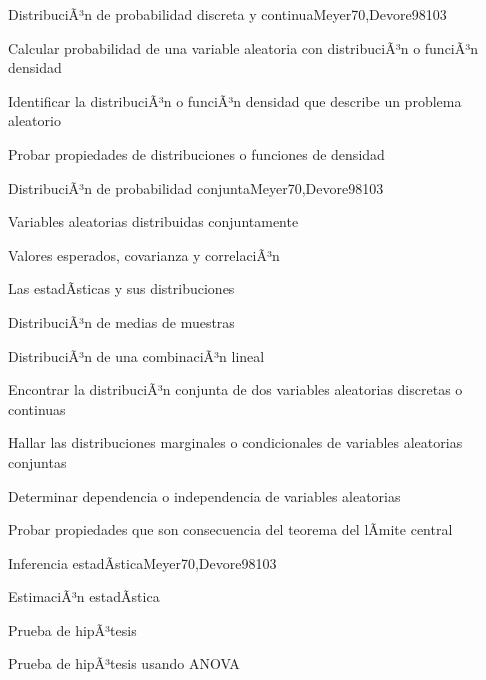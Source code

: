 \begin{syllabus}
\begin{unit}{DistribuciÃ³n de probabilidad discreta y continua}{Meyer70,Devore98}{10}{3}
   \begin{learningoutcomes}
      \item Calcular probabilidad de una variable aleatoria con distribuciÃ³n o funciÃ³n densidad
      \item Identificar la distribuciÃ³n o funciÃ³n densidad que describe un problema aleatorio
      \item Probar propiedades de distribuciones o funciones de densidad
   \end{learningoutcomes}
\end{unit}

\begin{unit}{DistribuciÃ³n de probabilidad conjunta}{Meyer70,Devore98}{10}{3}
\begin{topics}
      \item Variables aleatorias distribuidas conjuntamente
      \item Valores esperados, covarianza y correlaciÃ³n
      \item Las estadÃ­sticas y sus distribuciones
      \item DistribuciÃ³n de medias de muestras
      \item DistribuciÃ³n de una combinaciÃ³n lineal

   \end{topics}
   \begin{learningoutcomes}
      \item Encontrar la distribuciÃ³n conjunta de dos variables aleatorias discretas o continuas
      \item Hallar las distribuciones marginales o condicionales de variables aleatorias conjuntas
      \item Determinar dependencia o independencia de variables aleatorias
      \item Probar propiedades que son consecuencia del teorema  del lÃ­mite central
   \end{learningoutcomes}
\end{unit}

\begin{unit}{Inferencia estadÃ­stica}{Meyer70,Devore98}{10}{3}
\begin{topics}
      \item EstimaciÃ³n estadÃ­stica
      \item Prueba de hipÃ³tesis
      \item Prueba de hipÃ³tesis usando ANOVA
   \end{topics}


\end{unit}
\end{syllabus}

